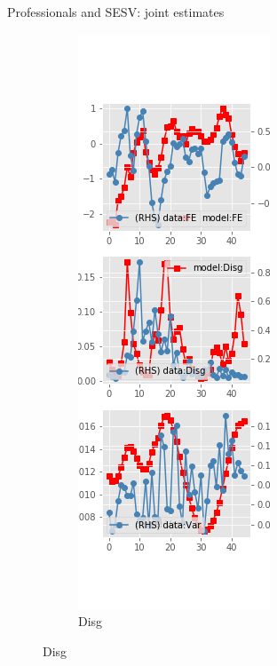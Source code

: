 \documentclass{beamer}
\begin{document}
\begin{frame}{Professionals and SESV: joint estimates}
\begin{figure}[ht]
\begin{subfigure}[b]{0.2\textwidth}
		\end{subfigure}
		\hfill
		\begin{subfigure}[b]{0.2\textwidth}
			\caption{Disg}
			\includegraphics[width=\textwidth, height = 0.8\textheight]{figuresDraft/spf_se_est_sv_joint_diag1.png}

\end{subfigure}
\end{figure}
\end{frame}
\end{document}
